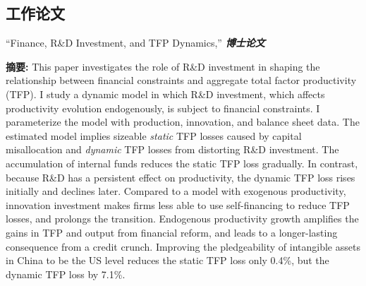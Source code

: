 \documentclass[letterpaper]{article}
\begin{document}
{\subsection*{\bf{工作论文}}
“Finance, R\&D Investment, and TFP Dynamics,” \textbf{\textit{博士论文}}
 \vspace{0.05in}
 \begin{center}
 \begin{minipage}{0.9\linewidth}
   \textbf{摘要:} This paper investigates the role of R\&D investment in shaping the relationship between financial constraints and aggregate total factor productivity (TFP). I study a dynamic model in which R\&D investment, which affects productivity evolution endogenously, is subject to financial constraints. I parameterize the model with production, innovation, and balance sheet data. The estimated model implies sizeable \textit{static} TFP losses caused by capital misallocation and \textit{dynamic} TFP losses from distorting R\&D investment. The accumulation of internal funds reduces the static TFP loss gradually. In contrast, because R\&D has a persistent effect on productivity, the dynamic TFP loss rises initially and declines later. Compared to a model with exogenous productivity, innovation investment makes firms less able to use self-financing to reduce TFP losses, and prolongs the transition. Endogenous productivity growth amplifies the gains in TFP and output from financial reform, and leads to a longer-lasting consequence from a credit crunch. Improving the pledgeability of intangible assets in China to be the US level reduces the static TFP loss only 0.4\%, but the dynamic TFP loss by 7.1\%. 
 \end{minipage}
 \end{center}
 \vspace{0.05in}
 
}
\end{document}
